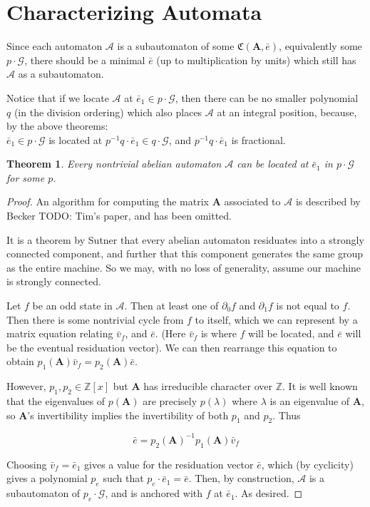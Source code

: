 \documentclass[12pt]{article}
\newcommand{\A}{\mathcal{A}}
\newcommand{\G}{\mathcal{G}}
\newcommand{\C}{\mathfrak{C}(\Am,\e)}
\newcommand{\Z}{\mathbb{Z}}
\newcommand{\2}{\textbf{2}}
\newcommand{\Am}{\textbf{A}}
\newcommand{\del}{\partial}
\renewcommand{\v}{\bar{v}}
\newcommand{\e}{\bar{e}}
\newtheorem{thm}{Theorem}
\begin{document}
\section{Characterizing Automata}
Since each automaton $\A$ is a subautomaton of some $\C$,
equivalently some $p \cdot \G$, there should be a minimal $\e$ 
(up to multiplication by units) which still has $\A$ as a subautomaton. 

Notice that if we locate $\A$ at $\e_1 \in p \cdot \G$, 
then there can be no smaller polynomial $q$ (in the division ordering)
which also places $\A$ at an integral position, because, by the above
theorems:\\ 
$\e_1 \in p \cdot \G$ is located at $p^{-1}q \cdot \e_1 \in q \cdot \G$, 
and $p^{-1}q \cdot \e_1$ is fractional.


\begin{thm}
  Every nontrivial abelian automaton $\A$ can be 
  located at $\e_1$ in $p \cdot \G$ for some $p$.
\end{thm}

\begin{proof}
  An algorithm for computing the matrix $\Am$ associated to $\A$ is
  described by Becker TODO: Tim's paper, and has been omitted.

  It is a theorem by Sutner \cite{Sutner18:abelian_automata} that every 
  abelian automaton residuates into a strongly connected component, 
  and further that this component generates the same group as the entire 
  machine. So we may, with no loss of generality, assume our machine is 
  strongly connected.

  Let $f$ be an odd state in $\A$. Then at least one of $\del_0 f$ and 
  $\del_1 f$ is not equal to $f$. Then there is some nontrivial cycle
  from $f$ to itself, which we can represent by a matrix equation 
  relating $\v_f$, and $\e$. (Here $\v_f$ is where $f$ will be located, 
  and $\e$ will be the eventual residuation vector). 
  We can then rearrange this equation to obtain 
  $p_1(\Am)\v_f = p_2(\Am)\e$.

  However, $p_1, p_2 \in \Z[x]$ but $\Am$ has irreducible character over $\Z$.
  It is well known that the eigenvalues of $p(\Am)$ are precisely $p(\lambda)$
  where $\lambda$ is an eigenvalue of $\Am$, so $\Am$'s invertibility implies
  the invertibility of both $p_1$ and $p_2$. Thus

  \[ \e = p_2(\Am)^{-1}p_1(\Am)\v_f \]

  Choosing $\v_f = \e_1$ gives a value for the residuation vector $\e$,
  which (by cyclicity) gives a polynomial $p_e$ 
  such that $p_e \cdot \e_1 = \e$. Then, by construction, $\A$ is 
  a subautomaton of $p_e \cdot \G$, and is anchored with $f$ at $\e_1$.
  As desired.
\end{proof}
\end{document}
